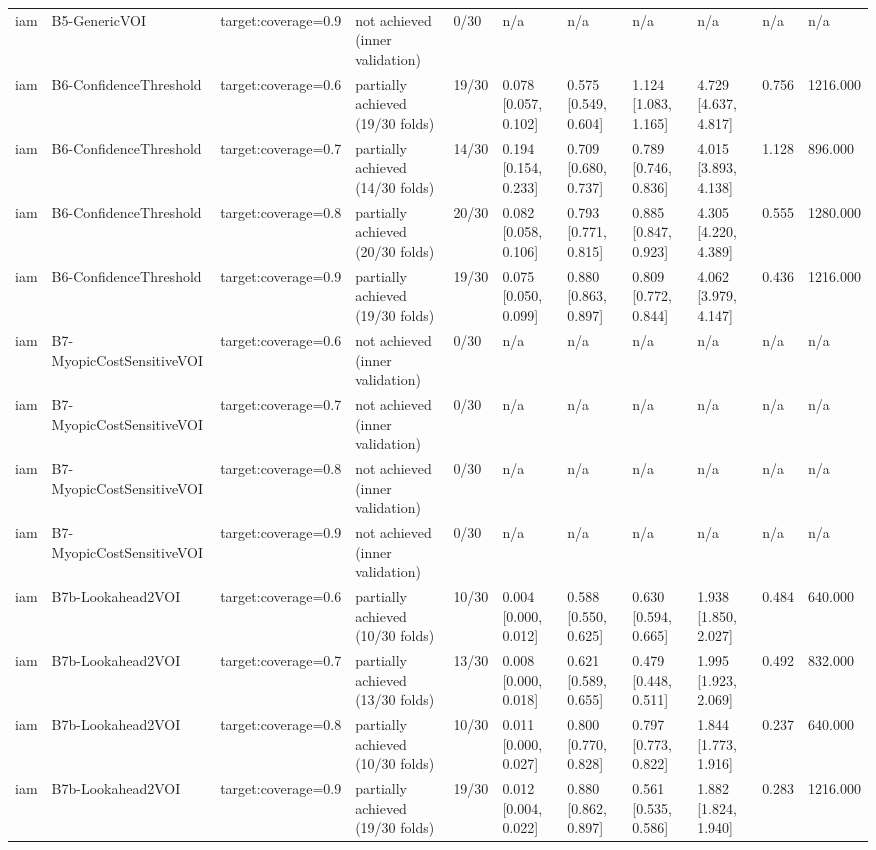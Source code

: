 \begin{table}[!ht]
{\begin{tabular}{lllllllllll}
iam & B5-GenericVOI & target:coverage=0.9 & not achieved (inner validation) & 0/30 & n/a & n/a & n/a & n/a & n/a & n/a \\
iam & B6-ConfidenceThreshold & target:coverage=0.6 & partially achieved (19/30 folds) & 19/30 & 0.078 [0.057, 0.102] & 0.575 [0.549, 0.604] & 1.124 [1.083, 1.165] & 4.729 [4.637, 4.817] & 0.756 & 1216.000 \\
iam & B6-ConfidenceThreshold & target:coverage=0.7 & partially achieved (14/30 folds) & 14/30 & 0.194 [0.154, 0.233] & 0.709 [0.680, 0.737] & 0.789 [0.746, 0.836] & 4.015 [3.893, 4.138] & 1.128 & 896.000 \\
iam & B6-ConfidenceThreshold & target:coverage=0.8 & partially achieved (20/30 folds) & 20/30 & 0.082 [0.058, 0.106] & 0.793 [0.771, 0.815] & 0.885 [0.847, 0.923] & 4.305 [4.220, 4.389] & 0.555 & 1280.000 \\
iam & B6-ConfidenceThreshold & target:coverage=0.9 & partially achieved (19/30 folds) & 19/30 & 0.075 [0.050, 0.099] & 0.880 [0.863, 0.897] & 0.809 [0.772, 0.844] & 4.062 [3.979, 4.147] & 0.436 & 1216.000 \\
iam & B7-MyopicCostSensitiveVOI & target:coverage=0.6 & not achieved (inner validation) & 0/30 & n/a & n/a & n/a & n/a & n/a & n/a \\
iam & B7-MyopicCostSensitiveVOI & target:coverage=0.7 & not achieved (inner validation) & 0/30 & n/a & n/a & n/a & n/a & n/a & n/a \\
iam & B7-MyopicCostSensitiveVOI & target:coverage=0.8 & not achieved (inner validation) & 0/30 & n/a & n/a & n/a & n/a & n/a & n/a \\
iam & B7-MyopicCostSensitiveVOI & target:coverage=0.9 & not achieved (inner validation) & 0/30 & n/a & n/a & n/a & n/a & n/a & n/a \\
iam & B7b-Lookahead2VOI & target:coverage=0.6 & partially achieved (10/30 folds) & 10/30 & 0.004 [0.000, 0.012] & 0.588 [0.550, 0.625] & 0.630 [0.594, 0.665] & 1.938 [1.850, 2.027] & 0.484 & 640.000 \\
iam & B7b-Lookahead2VOI & target:coverage=0.7 & partially achieved (13/30 folds) & 13/30 & 0.008 [0.000, 0.018] & 0.621 [0.589, 0.655] & 0.479 [0.448, 0.511] & 1.995 [1.923, 2.069] & 0.492 & 832.000 \\
iam & B7b-Lookahead2VOI & target:coverage=0.8 & partially achieved (10/30 folds) & 10/30 & 0.011 [0.000, 0.027] & 0.800 [0.770, 0.828] & 0.797 [0.773, 0.822] & 1.844 [1.773, 1.916] & 0.237 & 640.000 \\
iam & B7b-Lookahead2VOI & target:coverage=0.9 & partially achieved (19/30 folds) & 19/30 & 0.012 [0.004, 0.022] & 0.880 [0.862, 0.897] & 0.561 [0.535, 0.586] & 1.882 [1.824, 1.940] & 0.283 & 1216.000 \\

\end{tabular}}
\end{table}
